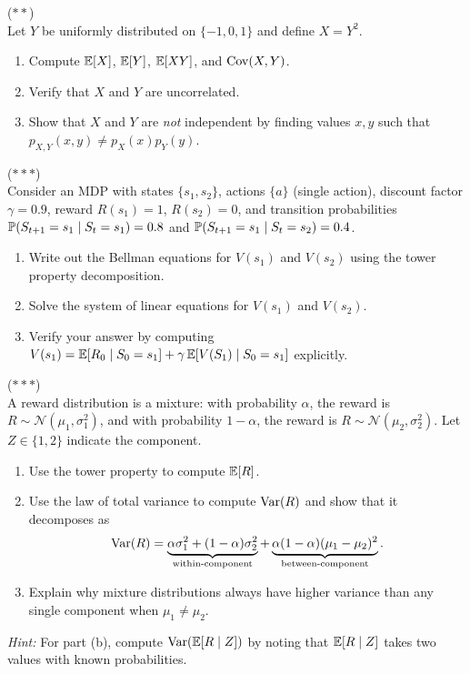 \documentclass[11pt,a4paper]{article}
\begin{document}
\begin{exercise}
\textnormal{(\(\ast\ast\))} \\
Let $Y$ be uniformly distributed on $\{-1, 0, 1\}$ and define
$X = Y^2$.
\begin{enumerate}[nosep,label=(\alph*)]
    \item Compute $\mathbb{E}[X]$, $\mathbb{E}[Y]$, $\mathbb{E}[XY]$, and $\operatorname{Cov}(X, Y)$.
    \item Verify that $X$ and $Y$ are uncorrelated.
    \item Show that $X$ and $Y$ are \emph{not} independent by finding
    values $x, y$ such that $p_{X,Y}(x, y) \neq p_X(x) p_Y(y)$.
\end{enumerate}
\end{exercise}

\begin{exercise}
\textnormal{(\(\ast\ast\ast\))} \\
Consider an MDP with states $\{s_1, s_2\}$, actions $\{a\}$ (single
action), discount factor $\gamma = 0.9$, reward
$R(s_1) = 1$, $R(s_2) = 0$, and transition probabilities
$\mathbb{P}(S_{t+1} = s_1 \mid S_t = s_1) = 0.8$ and
$\mathbb{P}(S_{t+1} = s_1 \mid S_t = s_2) = 0.4$.
\begin{enumerate}[nosep,label=(\alph*)]
    \item Write out the Bellman equations for $V(s_1)$ and $V(s_2)$
    using the tower property decomposition.
    \item Solve the system of linear equations for $V(s_1)$ and
    $V(s_2)$.
    \item Verify your answer by computing
    $V(s_1) = \mathbb{E}[R_0 \mid S_0 = s_1] + \gamma \, \mathbb{E}[V(S_1) \mid
    S_0 = s_1]$ explicitly.
\end{enumerate}
\end{exercise}

\begin{exercise}
\textnormal{(\(\ast\ast\ast\))} \\
A reward distribution is a mixture: with probability $\alpha$, the
reward is $R \sim \mathcal{N}(\mu_1, \sigma_1^2)$, and with probability
$1 - \alpha$, the reward is $R \sim \mathcal{N}(\mu_2, \sigma_2^2)$.
Let $Z \in \{1, 2\}$ indicate the component.
\begin{enumerate}[nosep,label=(\alph*)]
    \item Use the tower property to compute $\mathbb{E}[R]$.
    \item Use the law of total variance to compute $\operatorname{Var}(R)$ and show
    that it decomposes as
    \[
        \Var(R) = \underbrace{\alpha\sigma_1^2 +
        (1-\alpha)\sigma_2^2}_{\text{within-component}}
        + \underbrace{\alpha(1-\alpha)(\mu_1 - \mu_2)^2}_{%
        \text{between-component}}.
    \]
    \item Explain why mixture distributions always have higher variance
    than any single component when $\mu_1 \neq \mu_2$.
\end{enumerate}
\textit{Hint:} For part (b), compute $\operatorname{Var}(\mathbb{E}[R \mid Z])$ by noting
that $\mathbb{E}[R \mid Z]$ takes two values with known probabilities.
\end{exercise}
\end{document}
